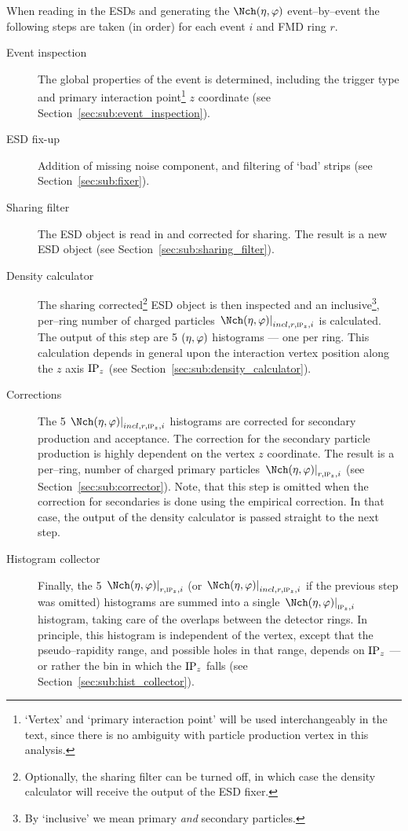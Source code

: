 \documentclass[compat,11pt]{alicenote}
\DeclareRobustCommand{\AlwaysText}[1]{\ifmmode\relax\text{#1}\else #1\fi}
\newcommand*{\etaphi}{\ensuremath(\eta,\varphi)}
\newcommand*\ESD{\AlwaysText{ESD}}
\newcommand{\secref}[1]{Section~\ref{#1}}
\newcommand{\dndetadphi}[1][]{{\ensuremath%
    \ifx|#1|\else\left.\fi%
      \Nch\etaphi%
      \ifx|#1|\else\right|_{#1}\fi}}
\begin{document}
When reading in the \ESD{}s and generating the $\dndetadphi$
event--by--event the following steps are taken (in order) for each
event $i$ and FMD ring $r$.
\begin{description}
\item[Event inspection] The global properties of the event is
  determined, including the trigger type and primary interaction
  point\footnote{`Vertex' and `primary interaction point' will be used
    interchangeably in the text, since there is no ambiguity with
    particle production vertex in this analysis.} $z$ coordinate (see
  \secref{sec:sub:event_inspection}).
\item[\ESD{} fix-up] Addition of missing noise component, and filtering
  of `bad' strips (see \secref{sec:sub:fixer}).
\item[Sharing filter] The \ESD{} object is read in and corrected for
  sharing.  The result is a new \ESD{} object (see
  \secref{sec:sub:sharing_filter}).
\item[Density calculator] The sharing corrected\footnote{Optionally,
    the sharing filter can be turned off, in which case the density
    calculator will receive the output of the \ESD{} fixer.} \ESD{}
  object is then inspected and an inclusive\footnote{By `inclusive' we
    mean primary \emph{and} secondary particles.}, per--ring number of
  charged particles $\dndetadphi[incl,r,\subIPz{},i]$ is calculated.
  The output of this step are 5 $\etaphi$ histograms --- one per
  \FMD{} ring.  This calculation depends in general upon the
  interaction vertex position along the $z$ axis $\IPz{}$ (see
  \secref{sec:sub:density_calculator}).
\item[Corrections] The 5 $\dndetadphi[incl,r,\subIPz{},i]$ histograms
  are corrected for secondary production and acceptance.  The
  correction for the secondary particle production is highly dependent
  on the vertex $z$ coordinate.  The result is a per--ring, number of
  charged primary particles $\dndetadphi[r,\subIPz{},i]$ (see
  \secref{sec:sub:corrector}).  Note, that this step is omitted when
  the correction for secondaries is done using the empirical
  correction.   In that case, the output of the density calculator is
  passed straight to the next step. 
\item[Histogram collector] Finally, the 5 $\dndetadphi[r,\subIPz{},i]$
  (or $\dndetadphi[incl,r,\subIPz{},i]$ if the previous step was
  omitted) histograms are summed into a single
  $\dndetadphi[\subIPz{},i]$ histogram, taking care of the overlaps
  between the detector rings.  In principle, this histogram is
  independent of the vertex, except that the pseudo--rapidity range,
  and possible holes in that range, depends on $\IPz{}$ --- or rather
  the bin in which the $\IPz{}$ falls (see
  \secref{sec:sub:hist_collector}).
\end{description}
\end{document}
